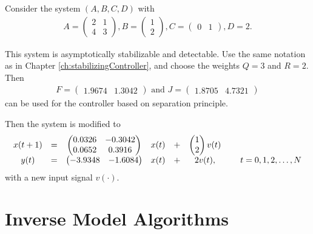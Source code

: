 \begin{exam}
	
	
	Consider the system $(A,B,C,D)$ with 
	\begin{align}
	\label{eq:ILC:Sys_ex1}
	A = \begin{pmatrix}
	2 & 1 \\  4 & 3
	\end{pmatrix}, B = \begin{pmatrix}
	1 \\ 2
	\end{pmatrix}, C = \begin{pmatrix}
	0 & 1
	\end{pmatrix}, D = 2.
	\end{align}
	
	
	This system is asymptotically stabilizable and detectable. Use the same notation as in Chapter \ref{ch:stabilizingController}, and choose the weights $Q = 3$ and $R = 2$. Then 
	\begin{align}
	F =\begin{pmatrix}
	1.9674  &  1.3042
	\end{pmatrix} \text{ and } 
	J = \begin{pmatrix}
	1.8705  &  4.7321
	\end{pmatrix}
	\end{align}
	can be used for the controller based on separation principle. 
	
	
	Then the system is modified to 
	\begin{align}
	\label{eq:ILC:Sys_ex1_modified}
	\begin{array}{c c c c c c c c c}
	x(t+1) &=&
	\begin{pmatrix}
	0.0326  & -0.3042\\
	0.0652  &  0.3916
	\end{pmatrix}
	& x(t) &+& 
	\begin{pmatrix}
	1 \\ 2
	\end{pmatrix}
	v(t)& &
	\\ 
	y(t)   &=& \begin{pmatrix}
	-3.9348  & -1.6084
	\end{pmatrix}
	& x(t)& +&
	2 v (t),& &\; t = 0, 1, 2, \dots, N
	\end{array}
	\end{align} with a new input signal $v(\cdot)$. 
	
\end{exam}

\section{Inverse Model Algorithms}

